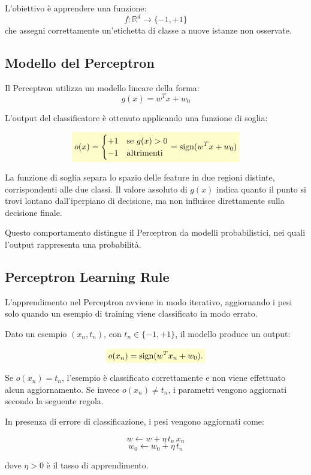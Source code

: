 \documentclass[a4paper,12pt]{report}
\newcommand{\highlight}[1]{%
\colorbox{yellow!20}{$\displaystyle #1$}%
}
\begin{document}
L’obiettivo è apprendere una funzione:
\[
f : \mathbb{R}^d \rightarrow \{-1, +1\}
\]
che assegni correttamente un’etichetta di classe a nuove istanze non osservate.

\subsection{Modello del Perceptron}

Il Perceptron utilizza un modello lineare della forma:
\[
g(x) = w^T x + w_0
\]

L’output del classificatore è ottenuto applicando una funzione di soglia:

\[
\highlight{
o(x) =
\begin{cases}
+1 & \text{se } g(x) > 0 \\
-1 & \text{altrimenti}
\end{cases}
=
\text{sign}(w^T x + w_0)}
\]

La funzione di soglia separa lo spazio delle feature in due regioni distinte, corrispondenti alle due classi.
Il valore assoluto di \( g(x) \) indica quanto il punto si trovi lontano dall’iperpiano di decisione, ma non influisce direttamente sulla decisione finale.

Questo comportamento distingue il Perceptron da modelli probabilistici, nei quali l’output rappresenta una probabilità.

\subsection{Perceptron Learning Rule}

L’apprendimento nel Perceptron avviene in modo iterativo, aggiornando i pesi solo quando un esempio di training viene classificato in modo errato.

Dato un esempio \( (x_n, t_n) \), con \( t_n \in \{-1, +1\} \), il modello produce un output:

\[
\highlight{
o(x_n) = \text{sign}(w^T x_n + w_0).}
\]

Se \( o(x_n) = t_n \), l’esempio è classificato correttamente e non viene effettuato alcun aggiornamento.
Se invece \( o(x_n) \neq t_n \), i parametri vengono aggiornati secondo la seguente regola.


In presenza di errore di classificazione, i pesi vengono aggiornati come:

\[
w \leftarrow w + \eta \, t_n \, x_n
\]
\[
w_0 \leftarrow w_0 + \eta \, t_n 
\]

dove \( \eta > 0 \) è il tasso di apprendimento.
\end{document}
